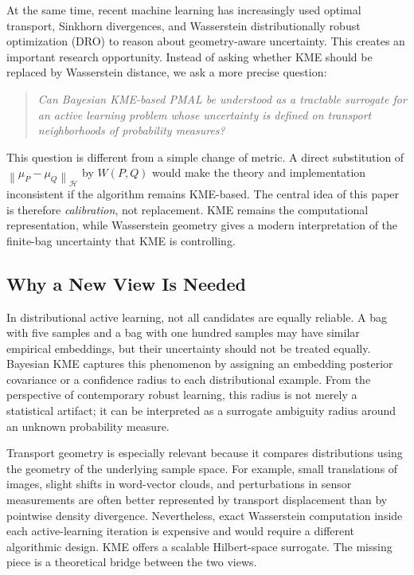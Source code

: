 \documentclass[10pt,journal]{IEEEtran}
\newcommand{\Hcal}{\mathcal{H}}
\newcommand{\norm}[1]{\left\lVert #1 \right\rVert}
\begin{document}
At the same time, recent machine learning has increasingly used optimal transport, Sinkhorn divergences, and Wasserstein distributionally robust optimization (DRO) to reason about geometry-aware uncertainty. This creates an important research opportunity. Instead of asking whether KME should be replaced by Wasserstein distance, we ask a more precise question:
\begin{quote}
\emph{Can Bayesian KME-based PMAL be understood as a tractable surrogate for an active learning problem whose uncertainty is defined on transport neighborhoods of probability measures?}
\end{quote}
This question is different from a simple change of metric. A direct substitution of $\norm{\mu_P-\mu_Q}_{\Hcal}$ by $W(P,Q)$ would make the theory and implementation inconsistent if the algorithm remains KME-based. The central idea of this paper is therefore \emph{calibration}, not replacement. KME remains the computational representation, while Wasserstein geometry gives a modern interpretation of the finite-bag uncertainty that KME is controlling.

\subsection{Why a New View Is Needed}

In distributional active learning, not all candidates are equally reliable. A bag with five samples and a bag with one hundred samples may have similar empirical embeddings, but their uncertainty should not be treated equally. Bayesian KME captures this phenomenon by assigning an embedding posterior covariance or a confidence radius to each distributional example. From the perspective of contemporary robust learning, this radius is not merely a statistical artifact; it can be interpreted as a surrogate ambiguity radius around an unknown probability measure.

Transport geometry is especially relevant because it compares distributions using the geometry of the underlying sample space. For example, small translations of images, slight shifts in word-vector clouds, and perturbations in sensor measurements are often better represented by transport displacement than by pointwise density divergence. Nevertheless, exact Wasserstein computation inside each active-learning iteration is expensive and would require a different algorithmic design. KME offers a scalable Hilbert-space surrogate. The missing piece is a theoretical bridge between the two views.
\end{document}
